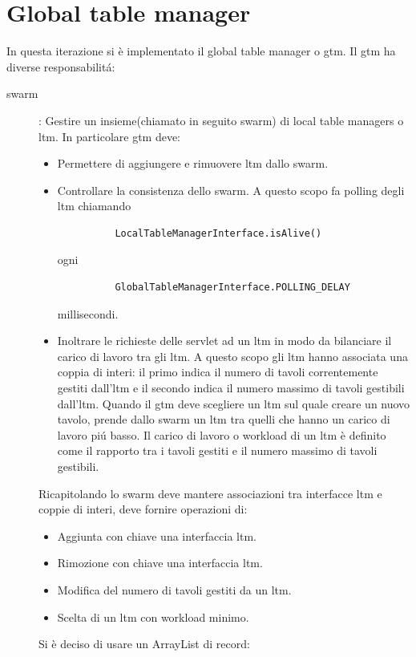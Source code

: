 \section{Global table manager}
    In questa iterazione si \`e implementato il global table manager o gtm. Il gtm ha diverse responsabilit\'a: 
    \begin{description}
      \item[swarm]: 
	Gestire un insieme(chiamato in seguito swarm) di local table managers o ltm. In particolare gtm deve:
	\begin{itemize}
	  \item 
	    Permettere di aggiungere e rimuovere ltm dallo swarm.
	  \item
	    Controllare la consistenza dello swarm. A questo scopo fa polling degli ltm chiamando 	
	    \begin{verbatim} 
	      LocalTableManagerInterface.isAlive()
	    \end{verbatim}
	    ogni 
	    \begin{verbatim} 
	      GlobalTableManagerInterface.POLLING_DELAY
	    \end{verbatim} 
	    millisecondi.   
	  \item
	    Inoltrare le richieste delle servlet ad un ltm in modo da bilanciare il carico di lavoro tra gli ltm. A questo scopo gli ltm hanno associata una coppia di interi: il primo indica il numero di tavoli correntemente gestiti dall'ltm e il secondo indica il numero massimo di tavoli gestibili dall'ltm. Quando il gtm deve scegliere un ltm sul quale creare un nuovo tavolo, prende dallo swarm un ltm tra quelli che hanno un carico di lavoro pi\'u basso. Il carico di lavoro o workload di un ltm \`e definito come il rapporto tra i tavoli gestiti e il numero massimo di tavoli gestibili.
	\end{itemize}
	Ricapitolando lo swarm deve mantere associazioni tra interfacce ltm e coppie di interi, deve fornire operazioni di:
	\begin{itemize}
	   \item 	
	      Aggiunta con chiave una interfaccia ltm.
	   \item 
	      Rimozione con chiave una interfaccia ltm.
	   \item 
	      Modifica del numero di tavoli gestiti da un ltm.
	   \item 	
	      Scelta di un ltm con workload minimo.
	\end{itemize}
	Si \`e deciso di usare un ArrayList di record:
	\begin{verbatim}

\end{verbatim}
\end{description}
